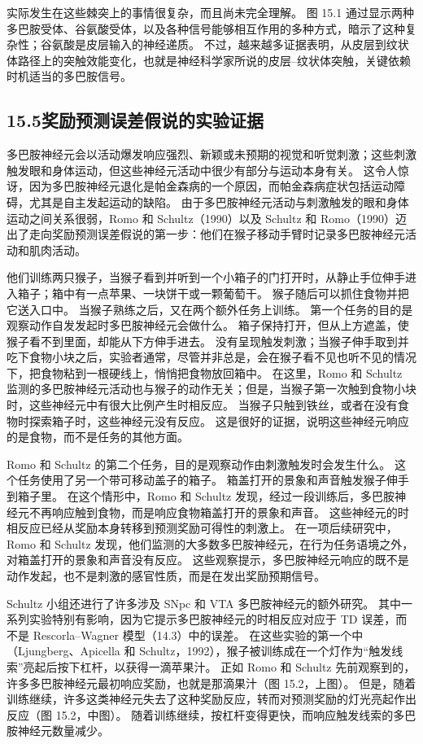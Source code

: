 \documentclass[UTF8, 12pt, fontset=fandol, oneside]{ctexart}
\begin{document}
实际发生在这些棘突上的事情很复杂，而且尚未完全理解。
图 15.1 通过显示两种多巴胺受体、谷氨酸受体，以及各种信号能够相互作用的多种方式，暗示了这种复杂性；谷氨酸是皮层输入的神经递质。
不过，越来越多证据表明，从皮层到纹状体路径上的突触效能变化，也就是神经科学家所说的皮层--纹状体突触，关键依赖时机适当的多巴胺信号。

\subsection*{15.5\quad 奖励预测误差假说的实验证据}

多巴胺神经元会以活动爆发响应强烈、新颖或未预期的视觉和听觉刺激；这些刺激触发眼和身体运动，但这些神经元活动中很少有部分与运动本身有关。
这令人惊讶，因为多巴胺神经元退化是帕金森病的一个原因，而帕金森病症状包括运动障碍，尤其是自主发起运动的缺陷。
由于多巴胺神经元活动与刺激触发的眼和身体运动之间关系很弱，Romo 和 Schultz（1990）以及 Schultz 和 Romo（1990）迈出了走向奖励预测误差假说的第一步：他们在猴子移动手臂时记录多巴胺神经元活动和肌肉活动。

他们训练两只猴子，当猴子看到并听到一个小箱子的门打开时，从静止手位伸手进入箱子；箱中有一点苹果、一块饼干或一颗葡萄干。
猴子随后可以抓住食物并把它送入口中。
当猴子熟练之后，又在两个额外任务上训练。
第一个任务的目的是观察动作自发发起时多巴胺神经元会做什么。
箱子保持打开，但从上方遮盖，使猴子看不到里面，却能从下方伸手进去。
没有呈现触发刺激；当猴子伸手取到并吃下食物小块之后，实验者通常，尽管并非总是，会在猴子看不见也听不见的情况下，把食物粘到一根硬线上，悄悄把食物放回箱中。
在这里，Romo 和 Schultz 监测的多巴胺神经元活动也与猴子的动作无关；但是，当猴子第一次触到食物小块时，这些神经元中有很大比例产生时相反应。
当猴子只触到铁丝，或者在没有食物时探索箱子时，这些神经元没有反应。
这是很好的证据，说明这些神经元响应的是食物，而不是任务的其他方面。

Romo 和 Schultz 的第二个任务，目的是观察动作由刺激触发时会发生什么。
这个任务使用了另一个带可移动盖子的箱子。
箱盖打开的景象和声音触发猴子伸手到箱子里。
在这个情形中，Romo 和 Schultz 发现，经过一段训练后，多巴胺神经元不再响应触到食物，而是响应食物箱盖打开的景象和声音。
这些神经元的时相反应已经从奖励本身转移到预测奖励可得性的刺激上。
在一项后续研究中，Romo 和 Schultz 发现，他们监测的大多数多巴胺神经元，在行为任务语境之外，对箱盖打开的景象和声音没有反应。
这些观察提示，多巴胺神经元响应的既不是动作发起，也不是刺激的感官性质，而是在发出奖励预期信号。

Schultz 小组还进行了许多涉及 SNpc 和 VTA 多巴胺神经元的额外研究。
其中一系列实验特别有影响，因为它提示多巴胺神经元的时相反应对应于 TD 误差，而不是 Rescorla--Wagner 模型（14.3）中的误差。
在这些实验的第一个中（Ljungberg、Apicella 和 Schultz，1992），猴子被训练成在一个灯作为“触发线索”亮起后按下杠杆，以获得一滴苹果汁。
正如 Romo 和 Schultz 先前观察到的，许多多巴胺神经元最初响应奖励，也就是那滴果汁（图 15.2，上图）。
但是，随着训练继续，许多这类神经元失去了这种奖励反应，转而对预测奖励的灯光亮起作出反应（图 15.2，中图）。
随着训练继续，按杠杆变得更快，而响应触发线索的多巴胺神经元数量减少。
\end{document}
